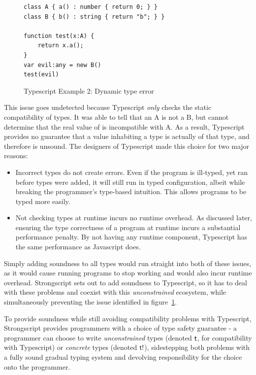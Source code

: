 \documentclass[a4paper,USenglish]{tex/lipics-v2016}
\begin{document}
\begin{figure}[h]
\begin{verbatim}
class A { a() : number { return 0; } }
class B { b() : string { return "b"; } }

function test(x:A) {
	return x.a();
}
var evil:any = new B()
test(evil)
\end{verbatim}
\caption{Typescript Example 2: Dynamic type error}
\label{fig:tsex2}
\end{figure}

This issue goes undetected because Typescript \emph{only} checks the static
compatibility of types. It was able to tell that an A is not a B, but cannot
determine that the real value of  is incompatible with A. As a result,
Typescript provides no guarantee that a value inhabiting a type is actually of
that type, and therefore is unsound. The designers of Typescript made this choice
for two major reasons:

\begin{itemize}
\item Incorrect types do not create errors. Even if the program is
  ill-typed, yet ran before types were added, it will still run in typed
  configuration, albeit while breaking the programmer's type-based
  intuition. This allows programs to be typed more easily.
\item Not checking types at runtime incurs no runtime overhead. As discussed
  later, ensuring the type correctness of a program at runtime incurs a
  substantial performance penalty. By not having any runtime component,
  Typescript has the same performance as Javascript does.
\end{itemize}

Simply adding soundness to all types would run straight into both of these
issues, as it would cause running programs to stop working and would 
also incur runtime overhead. Strongscript sets out to add soundness to
Typescript, so it has to deal with these problems and coexist with this
\emph{unconstrained} ecosystem, while simultaneously preventing the issue
identified in figure~\ref{fig:tsex2}.

To provide soundness while still avoiding compatibility problems with 
Typescript, Strongscript provides programmers with a choice of type
safety guarantee - a programmer can choose to write \emph{unconstrained}
types (denoted ${\sf{t}}$, for compatibility with Typescript) or \emph{concrete}
types (denoted ${\sf{t}}{\sf{!}}$), sidestepping both problems with a fully sound
gradual typing system and devolving responsibility for the choice onto
the programmer.
\end{document}
